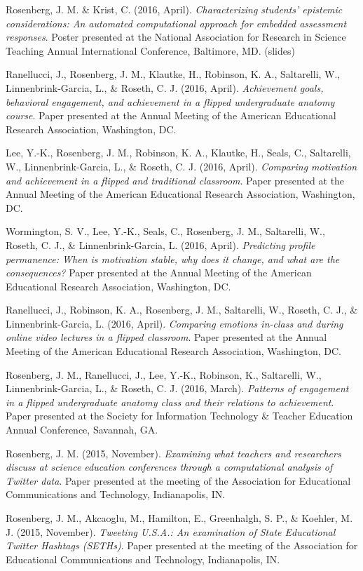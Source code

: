 \documentclass[14,]{article}
\begin{document}
Rosenberg, J. M. \& Krist, C. (2016, April). \emph{Characterizing
students' epistemic considerations: An automated computational approach
for embedded assessment responses}. Poster presented at the National
Association for Research in Science Teaching Annual International
Conference, Baltimore, MD. (slides)

Ranellucci, J., Rosenberg, J. M., Klautke, H., Robinson, K. A.,
Saltarelli, W., Linnenbrink-Garcia, L., \& Roseth, C. J. (2016, April).
\emph{Achievement goals, behavioral engagement, and achievement in a
flipped undergraduate anatomy course}. Paper presented at the Annual
Meeting of the American Educational Research Association, Washington,
DC.

Lee, Y.-K., Rosenberg, J. M., Robinson, K. A., Klautke, H., Seals, C.,
Saltarelli, W., Linnenbrink-Garcia, L., \& Roseth, C. J. (2016, April).
\emph{Comparing motivation and achievement in a flipped and traditional
classroom}. Paper presented at the Annual Meeting of the American
Educational Research Association, Washington, DC.

Wormington, S. V., Lee, Y.-K., Seals, C., Rosenberg, J. M., Saltarelli,
W., Roseth, C. J., \& Linnenbrink-Garcia, L. (2016, April).
\emph{Predicting profile permanence: When is motivation stable, why does
it change, and what are the consequences?} Paper presented at the Annual
Meeting of the American Educational Research Association, Washington,
DC.

Ranellucci, J., Robinson, K. A., Rosenberg, J. M., Saltarelli, W.,
Roseth, C. J., \& Linnenbrink-Garcia, L. (2016, April). \emph{Comparing
emotions in-class and during online video lectures in a flipped
classroom}. Paper presented at the Annual Meeting of the American
Educational Research Association, Washington, DC.

Rosenberg, J. M., Ranellucci, J., Lee, Y.-K., Robinson, K., Saltarelli,
W., Linnenbrink-Garcia, L., \& Roseth, C. J. (2016, March).
\emph{Patterns of engagement in a flipped undergraduate anatomy class
and their relations to achievement}. Paper presented at the Society for
Information Technology \& Teacher Education Annual Conference, Savannah,
GA.

Rosenberg, J. M. (2015, November). \emph{Examining what teachers and
researchers discuss at science education conferences through a
computational analysis of Twitter data}. Paper presented at the meeting
of the Association for Educational Communications and Technology,
Indianapolis, IN.

Rosenberg, J. M., Akcaoglu, M., Hamilton, E., Greenhalgh, S. P., \&
Koehler, M. J. (2015, November). \emph{Tweeting U.S.A.: An examination
of State Educational Twitter Hashtags (SETHs)}. Paper presented at the
meeting of the Association for Educational Communications and
Technology, Indianapolis, IN.
\end{document}
